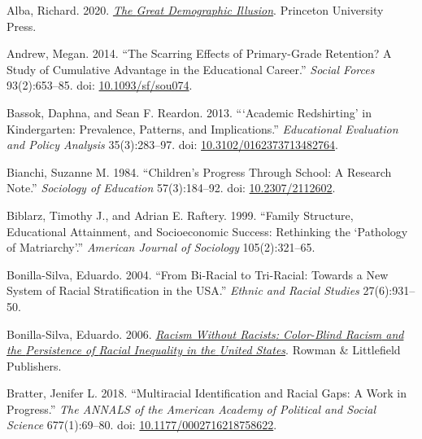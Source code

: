 \documentclass[
  letterpaper,
  DIV=11,
  numbers=noendperiod]{scrartcl}
\newlength{\cslhangindent}
\newlength{\cslentryspacingunit} %
\newenvironment{CSLReferences}[2] %
 {%
  \setlength{\parindent}{0pt}
  \ifodd #1
  \let\oldpar\par
  \def\par{\hangindent=\cslhangindent\oldpar}
  \fi
  \setlength{\parskip}{#2\cslentryspacingunit}
 }%
 {}
\begin{document}
\hypertarget{refs}{}
\begin{CSLReferences}{1}{0}
\leavevmode{}%
Alba, Richard. 2020.
\emph{\href{https://press.princeton.edu/books/hardcover/9780691201634/the-great-demographic-illusion}{The
{Great Demographic Illusion}}}. {Princeton University Press}.

\leavevmode{}%
Andrew, Megan. 2014. {``The {Scarring Effects} of {Primary-Grade
Retention}? {A Study} of {Cumulative Advantage} in the {Educational
Career}.''} \emph{Social Forces} 93(2):653--85. doi:
\href{https://doi.org/10.1093/sf/sou074}{10.1093/sf/sou074}.

\leavevmode{}%
Bassok, Daphna, and Sean F. Reardon. 2013. {``{`{Academic Redshirting}'}
in {Kindergarten}: {Prevalence}, {Patterns}, and {Implications}.''}
\emph{Educational Evaluation and Policy Analysis} 35(3):283--97. doi:
\href{https://doi.org/10.3102/0162373713482764}{10.3102/0162373713482764}.

\leavevmode{}%
Bianchi, Suzanne M. 1984. {``Children's {Progress Through School}: {A
Research Note}.''} \emph{Sociology of Education} 57(3):184--92. doi:
\href{https://doi.org/10.2307/2112602}{10.2307/2112602}.

\leavevmode{}%
Biblarz, Timothy J., and Adrian E. Raftery. 1999. {``Family {Structure},
{Educational Attainment}, and {Socioeconomic Success}: {Rethinking} the
{`{Pathology} of {Matriarchy}'}.''} \emph{American Journal of Sociology}
105(2):321--65.

\leavevmode{}%
Bonilla-Silva, Eduardo. 2004. {``From Bi-Racial to Tri-Racial: {Towards}
a New System of Racial Stratification in the {USA}.''} \emph{Ethnic and
Racial Studies} 27(6):931--50.

\leavevmode{}%
Bonilla-Silva, Eduardo. 2006.
\emph{\href{https://books.google.com?id=HKJE4rVZG1EC}{Racism Without
{Racists}: {Color-Blind Racism} and the {Persistence} of {Racial
Inequality} in the {United States}}}. {Rowman \& Littlefield
Publishers}.

\leavevmode{}%
Bratter, Jenifer L. 2018. {``Multiracial {Identification} and {Racial
Gaps}: {A Work} in {Progress}.''} \emph{The ANNALS of the American
Academy of Political and Social Science} 677(1):69--80. doi:
\href{https://doi.org/10.1177/0002716218758622}{10.1177/0002716218758622}.


\end{CSLReferences}
\end{document}
